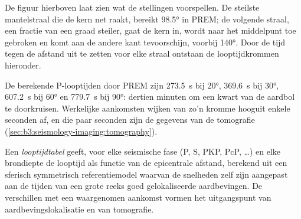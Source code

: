 \begin{omfigure}
\par{}
\label{fig:b3:seismology-imaging:rays}
\end{omfigure}

De figuur hierboven laat zien wat de stellingen voorspellen. De steilste mantelstraal die
de kern net raakt, bereikt \ang{98.5} in PREM; de volgende straal, een fractie van een
graad steiler, gaat de kern in, wordt naar het middelpunt toe gebroken en komt aan de
andere kant tevoorschijn, voorbij \ang{140}. Door de tijd tegen de afstand uit te zetten
voor elke straal ontstaan de looptijdkrommen hieronder.

De berekende P-looptijden door PREM zijn \qty{273.5}{s} bij \ang{20},
\qty{369.6}{s} bij \ang{30}, \qty{607.2}{s} bij \ang{60} en \qty{779.7}{s} bij
\ang{90}: dertien minuten om een kwart van de aardbol te doorkruisen.
Werkelijke aankomsten wijken van zo'n kromme hooguit enkele seconden af, en die paar
seconden zijn de gegevens van de tomografie (\cref{sec:b3:seismology-imaging:tomography}).

\begin{definition}[Looptijdtabel]\label{def:b3:seismology-imaging:tables}
Een \emph{looptijdtabel} geeft, voor elke seismische
fase (P, S, PKP, PcP, \dots) en elke brondiepte de looptijd als functie van
de epicentrale afstand, berekend uit een sferisch symmetrisch
referentiemodel waarvan de snelheden zelf zijn aangepast aan de tijden van een
grote reeks goed gelokaliseerde aardbevingen. De verschillen met een waargenomen
aankomst vormen het uitgangspunt van aardbevingslokalisatie en van tomografie.
\end{definition}

